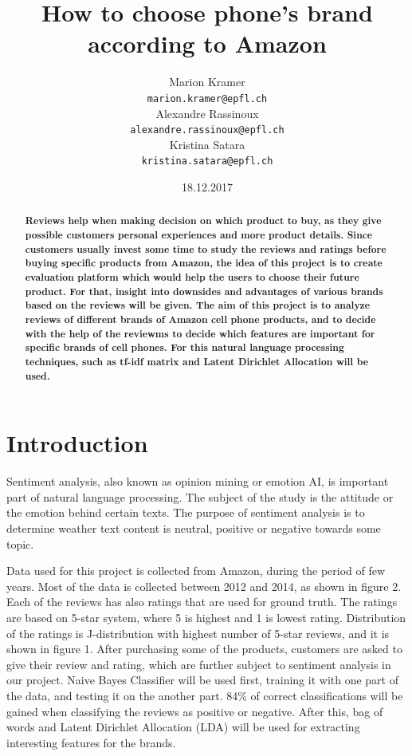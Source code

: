 \documentclass[11pt]{article}
\title{How to choose phone's brand according to Amazon}
\author{Marion Kramer\\
  {\tt marion.kramer@epfl.ch} \\\And
  Alexandre Rassinoux \\
  {\tt alexandre.rassinoux@epfl.ch} \\\And
Kristina Satara \\
{\tt kristina.satara@epfl.ch} \\}
\date{18.12.2017}
\begin{document}
\maketitle
\begin{abstract}
\textbf {Reviews help when making decision on which product to buy, as they give possible customers personal experiences and more product details. Since customers usually invest some time to study the reviews and ratings before buying specific products from Amazon, the idea of this project is to create evaluation platform which would help the users to choose their future product. For that, insight into  downsides and advantages of various brands based on the reviews will be given. The aim of this project is to analyze reviews of different brands of Amazon cell phone products, and to decide with the help of the reviewms to decide which features are important for specific brands of cell phones. For this natural language processing techniques, such as tf-idf matrix and Latent Dirichlet Allocation will be used.}
\end{abstract}


\section{Introduction}
Sentiment analysis, also known as opinion mining or emotion AI, is important part of natural language processing. The subject of the study is the attitude or the emotion behind certain texts. The purpose of sentiment analysis is to determine weather text content is neutral, positive or negative towards some topic. 

Data used for this project is collected from Amazon, during the period of few years. Most of the data is collected between 2012 and 2014, as shown in figure 2. Each of the reviews has also ratings that are used for ground truth. The ratings are based on 5-star system, where 5 is highest and 1 is lowest rating. Distribution of the ratings is J-distribution with highest number of 5-star reviews, and it is shown in figure 1. After purchasing some of the products, customers are asked to give their review and rating, which are further subject to sentiment analysis in our project. Naive Bayes Classifier will be used first, training it with one part of the data, and testing it on the another part. 84\% of correct classifications will be gained when classifying the reviews as positive or negative. After this, bag of words and Latent Dirichlet Allocation (LDA) will be used for extracting interesting features for the brands. 
\end{document}

